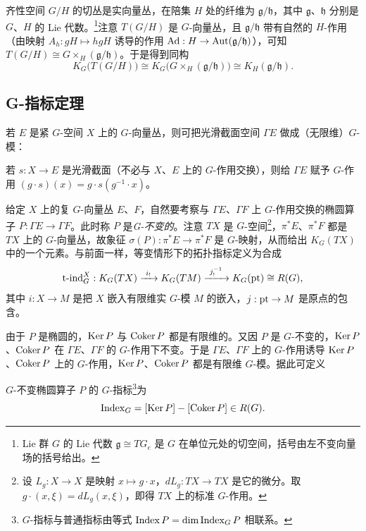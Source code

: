 \begin{example}
齐性空间 $G/H$ 的切丛是实向量丛，在陪集 $H$ 处的纤维为 $\mathfrak{g}/\mathfrak{h}$，其中 $\mathfrak{g}$、$\mathfrak{h}$ 分别是 $G$、$H$ 的 Lie 代数。\footnote{Lie 群 $G$ 的 Lie 代数 $\mathfrak{g}\cong TG_e$ 是 $G$ 在单位元处的切空间，括号由左不变向量场的括号给出。}注意 $T(G/H)$ 是 $G$-向量丛，且 $\mathfrak{g}/\mathfrak{h}$ 带有自然的 $H$-作用（由映射 $A_h:gH\mapsto hgH$ 诱导的作用 $\mathrm{Ad}:H\to\operatorname{Aut}(\mathfrak{g}/\mathfrak{h})$），可知 $T(G/H)\cong G\times_H(\mathfrak{g}/\mathfrak{h})$。于是得到同构
\[
K_G\big(T(G/H)\big)\cong K_G\big(G\times_H(\mathfrak{g}/\mathfrak{h})\big)\cong K_H(\mathfrak{g}/\mathfrak{h}).
\]
\end{example}

\subsection{G-指标定理}

若 $E$ 是紧 $G$-空间 $X$ 上的 $G$-向量丛，则可把光滑截面空间 $\Gamma E$ 做成（无限维）$G$-模：

\begin{definition}
若 $s:X\to E$ 是光滑截面（不必与 $X$、$E$ 上的 $G$-作用交换），则给 $\Gamma E$ 赋予 $G$-作用 $(g\cdot s)(x)=g\cdot s(g^{-1}\cdot x)$。
\end{definition}

给定 $X$ 上的复 $G$-向量丛 $E$、$F$，自然要考察与 $\Gamma E$、$\Gamma F$ 上 $G$-作用交换的椭圆算子 $P:\Gamma E\to\Gamma F$。此时称 $P$ 是\emph{G-不变的}。注意 $TX$ 是 $G$-空间\footnote{设 $L_g:X\to X$ 是映射 $x\mapsto g\cdot x$，$dL_g:TX\to TX$ 是它的微分。取 $g\cdot(x,\xi)=dL_g(x,\xi)$，即得 $TX$ 上的标准 $G$-作用。}，$\pi^*E$、$\pi^*F$ 都是 $TX$ 上的 $G$-向量丛，故象征 $\sigma(P):\pi^*E\to\pi^*F$ 是 $G$-映射，从而给出 $K_G(TX)$ 中的一个元素。与前面一样，等变情形下的拓扑指标定义为合成
\[
\tind_G^X:K_G(TX)\xrightarrow{\ i_!\ }K_G(TM)\xrightarrow{\ j_!^{-1}\ }K_G(\pt)\cong R(G),
\]
其中 $i:X\to M$ 是把 $X$ 嵌入有限维实 $G$-模 $M$ 的嵌入，$j:\mathrm{pt}\to M$ 是原点的包含。

由于 $P$ 是椭圆的，$\operatorname{Ker} P$ 与 $\operatorname{Coker} P$ 都是有限维的。又因 $P$ 是 $G$-不变的，$\operatorname{Ker} P$、$\operatorname{Coker} P$ 在 $\Gamma E$、$\Gamma F$ 的 $G$-作用下不变。于是 $\Gamma E$、$\Gamma F$ 上的 $G$-作用诱导 $\operatorname{Ker} P$、$\operatorname{Coker} P$ 上的 $G$-作用，$\operatorname{Ker} P$、$\operatorname{Coker} P$ 都是有限维 $G$-模。据此可定义

\begin{definition}
$G$-不变椭圆算子 $P$ 的 $G$-指标\footnote{$G$-指标与普通指标由等式 $\operatorname{Index} P=\dim\operatorname{Index}_G P$ 相联系。}为
\[
\operatorname{Index}_G=[\operatorname{Ker} P]-[\operatorname{Coker} P]\in R(G).
\]
\end{definition}

